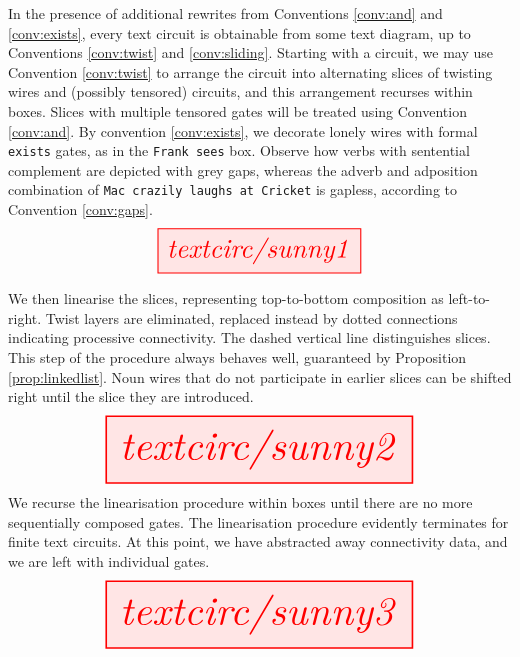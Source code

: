 \clearpage

\begin{myboxB}
\begin{construction}\label{cons:circ2text}
In the presence of additional rewrites from Conventions \ref{conv:and} and \ref{conv:exists}, every text circuit is obtainable from some text diagram, up to Conventions \ref{conv:twist} and \ref{conv:sliding}. Starting with a circuit, we may use Convention \ref{conv:twist} to arrange the circuit into alternating slices of twisting wires and (possibly tensored) circuits, and this arrangement recurses within boxes. Slices with multiple tensored gates will be treated using Convention \ref{conv:and}. By convention \ref{conv:exists}, we decorate lonely wires with formal \texttt{exists} gates, as in the \texttt{Frank sees} box. Observe how verbs with sentential complement are depicted with grey gaps, whereas the adverb and adposition combination of \texttt{Mac crazily laughs at Cricket} is gapless, according to Convention \ref{conv:gaps}.
\[
\resizebox{0.5\textwidth}{!}{\tikzfig{textcirc/sunny1}}
\]
\end{construction}
\end{myboxB}

\begin{myboxB}
We then linearise the slices, representing top-to-bottom composition as left-to-right. Twist layers are eliminated, replaced instead by dotted connections indicating processive connectivity. The dashed vertical line distinguishes slices. This step of the procedure always behaves well, guaranteed by Proposition \ref{prop:linkedlist}. Noun wires that do not participate in earlier slices can be shifted right until the slice they are introduced.
\[
\resizebox{0.75\textwidth}{!}{\tikzfig{textcirc/sunny2}}
\]
We recurse the linearisation procedure within boxes until there are no more sequentially composed gates. The linearisation procedure evidently terminates for finite text circuits. At this point, we have abstracted away connectivity data, and we are left with individual gates.
\[
\resizebox{0.75\textwidth}{!}{\tikzfig{textcirc/sunny3}}
\]

\end{myboxB}

\clearpage

